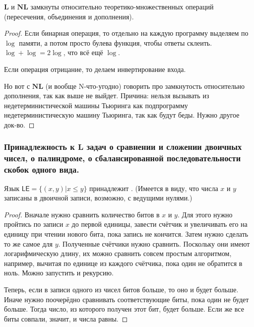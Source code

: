 \begin{corollary}
    $\mathbf{L}$ и $\mathbf{NL}$ замкнуты относительно теоретико-множественных операций (пересечения, объединения и дополнения).
\end{corollary}

\begin{proof}
    Если бинарная операция, то отдельно на каждую программу выделяем по $\log$ памяти, а потом просто булева функция, чтобы ответы склеить. $\log + \log = 2 \log$, что всё ещё $\log$.

    Если операция отрицание, то делаем инвертирование входа. 
    
    Но вот с $\mathbf{NL}$ (и вообще N-что-угодно) говорить про замкнутость относительно дополнения, так как выше не выйдет. Причина: нельзя вызывать из недетерминистической машины Тьюринга как подпрограмму недетерминистическую машину Тьюринга, так как будут беды. Нужно другое док-во.
\end{proof}

\subsubsection{Принадлежность к $\mathbf{L}$ задач о сравнении и сложении двоичных чисел, о палиндроме, о сбалансированной последовательности скобок одного вида.}
\begin{statement}
    Язык $\mathsf{LE} = \{(x, y) | x \leq y\}$ принадлежит \lsp. (Имеется в виду, что числа $x$ и $y$ записаны в двоичной записи, возможно, с ведущими нулями.)
\end{statement}

\begin{proof}
    Вначале нужно сравнить количество битов в $x$ и $y$. Для этого нужно пройтись по записи $x$ до первой единицы, завести счётчик и увеличивать его на единицу при чтении нового бита, пока запись не кончится. Затем нужно сделать то же самое для $y$. Полученные счётчики нужно сравнить. Поскольку они имеют логарифмическую длину, их можно сравнить совсем простым алгоритмом, например, вычитая по единице из каждого счётчика, пока один не обратится в ноль. Можно запустить и рекурсию. 
    
    Теперь, если в записи одного из чисел битов больше, то оно и будет больше. Иначе нужно поочерёдно сравнивать соответствующие биты, пока один не будет больше. Тогда число, из которого получен этот бит, будет больше. Если же все биты совпали, значит, и числа равны.
\end{proof}

